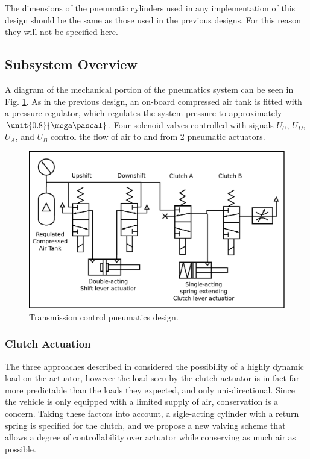 The dimensions of the pneumatic cylinders used in any implementation of this design should be the same as those used in the previous designs. For this reason they will not be specified here.

\subsection{Subsystem Overview}

A diagram of the mechanical portion of the pneumatics system can be seen in Fig. \ref{fig:pneumatics_design}. As in the previous design, an on-board compressed air tank is fitted with a pressure regulator, which regulates the system pressure to approximately $\unit{0.8}{\mega\pascal}$. Four solenoid valves controlled with signals $U_U$, $U_D$, $U_A$, and $U_B$ control the flow of air to and from 2 pneumatic actuators.

\begin{figure}[H]
\centering
\includegraphics[scale=0.5]{design/figures/pneumatics}
\caption{Transmission control pneumatics design.}
\label{fig:pneumatics_design}
\end{figure}

\subsubsection{Clutch Actuation}

The three approaches described in \cite{pneumatic_actuator, adaptive_pneumatic, accurate_position} considered the possibility of a highly dynamic load on the actuator, however the load seen by the clutch actuator is in fact far more predictable than the loads they expected, and only uni-directional. Since the vehicle is only equipped with a limited supply of air, conservation is a concern. Taking these factors into account, a sigle-acting cylinder with a return spring is specified for the clutch, and we propose a new valving scheme  that allows a degree of controllability over actuator while conserving as much air as possible.

